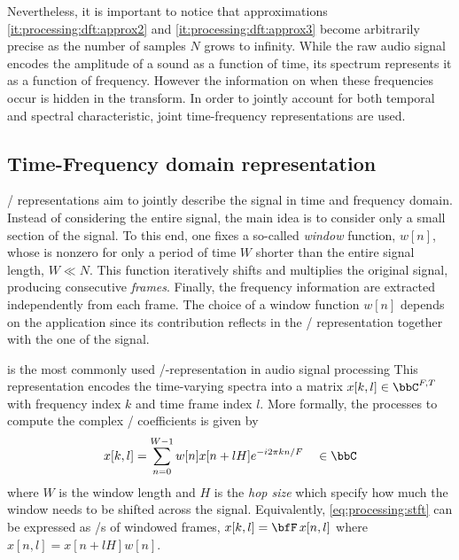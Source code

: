 Nevertheless, it is important to notice that approximations \ref{it:processing:dft:approx2} and \ref{it:processing:dft:approx3} become arbitrarily precise as the number of samples $N$ grows to infinity.
\mynewline
While the raw audio signal encodes the amplitude of a sound as a function of time,
its spectrum represents it as a function of frequency.
However the information on when these frequencies occur is hidden in the transform.
In order to jointly account for both temporal and spectral characteristic, joint time-frequency representations are used.

\subsection{Time-Frequency domain representation}
\TFdef/ representations aim to jointly describe the signal in time and frequency domain.
Instead of considering the entire signal, the main idea is to consider only a small section of the signal.
To this end, one fixes a so-called \textit{window} function, $w[n]$, whose is nonzero for only a period of time $W$ shorter than
the entire signal length, $W \ll N$.
This function iteratively shifts and multiplies the original signal, producing consecutive \textit{frames}.
Finally, the frequency information are extracted independently from each frame.
The choice of a window function $w[n]$ depends on the application since its contribution reflects in the \TF/ representation together with the
one of the signal.

is the most commonly used \TF/-representation in audio signal processing
This representation encodes the time-varying spectra into a matrix $x[k,l] \in \bbC^{F,T}$ with frequency index $k$ and time frame index $l$. More formally, the processes to compute the complex \STFT/ coefficients is given by
\begin{equation}\label{eq:processing:stft}
    x[k, l]  = \sum_{n=0}^{W-1} w[n] x[n + l H] \cste^{- \csti 2 \pi k n / F} \mathspace\in\bbC
\end{equation}
where $W$ is the window length and $H$ is the \textit{hop size} which specify how much the window needs to be shifted across the signal.
Equivalently, \cref{eq:processing:stft} can be expressed as \DFT/s of windowed frames, $x[k, l] = \discreteFT{x[n,l]}$ where $x[n,l] = x[n + l H] w[n]$.

